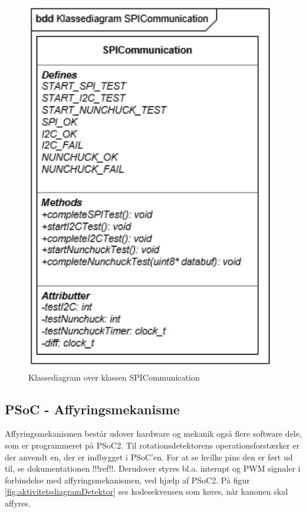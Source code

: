 \begin{figure}[H]
	\centering
	\includegraphics[]{DesignOgImplementering/images/SPICommunication}
	\caption{Klassediagram over klassen SPICommunication}
	\label{figure:KlassediagramSPICommunication}
\end{figure}


\subsection{PSoC - Affyringsmekanisme}
 
Affyringsmekanismen består udover hardware og mekanik også flere software dele, som er programmeret på PSoC2. Til rotationsdetektorens operationsforstærker er der anvendt en, der er indbygget i PSoC'en. For at se hvilke pins den er ført ud til, se dokumentationen !!!ref!!. Derudover styres bl.a. interupt og PWM signaler i forbindelse med affyringsmekanismen, ved hjælp af PSoC2.
På figur \ref{fig:aktivitetsdiagramDetektor} ses kodesekvensen som køres, når kanonen skal affyres. 
 
